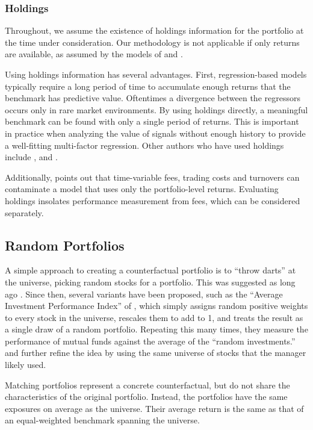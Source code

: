 \documentclass{article}\usepackage{graphicx, color}
\begin{document}
\subsubsection{Holdings}

Throughout, we assume the existence of holdings information for the portfolio at
the time under consideration. Our methodology is not applicable if
only returns are available, as assumed by the models of \cite{fama92} and
\cite{jensen68}.

Using holdings information has several advantages. First,
regression-based models typically require a
long period of time to accumulate enough returns that the benchmark
has predictive value. Oftentimes a divergence between the regressors
occurs only in rare market environments. By using holdings directly,
a meaningful benchmark can be found with only a single period of
returns. This is important in practice when analyzing the value of
signals without enough history to provide a well-fitting multi-factor
regression. Other authors who have used holdings include \cite{grinblatt89},
\cite{grinblatt93} and \cite{kosowski06}.

Additionally, \cite{daniel97.1} points out that time-variable fees, trading
costs and turnovers can contaminate a model that uses only the
portfolio-level returns. Evaluating holdings insolates performance
measurement from fees, which can be considered separately.

\subsection{Random Portfolios \label{SectionRandom}}

A simple approach to creating a counterfactual portfolio is to ``throw
darts'' at the universe, picking random stocks for a
portfolio. This was suggested as long ago \cite{lorie65}. Since then,
several variants have been proposed, such as the ``Average Investment
Performance Index'' of \cite{cohen66}, which simply assigns random
positive weights to every stock in the universe, rescales
them to add to 1, and treats the result as a single draw of a random
portfolio. Repeating this many times, they measure the performance
of mutual funds against the average of the ``random investments.''
\cite{burns04} and \cite{dawson03} further refine the idea by using
the same universe of stocks that the manager likely used.

Matching portfolios represent a concrete counterfactual, but do not
share the characteristics of the original portfolio. Instead, the portfolios
have the same exposures on average as the universe. Their average
return is the same as that of an equal-weighted benchmark spanning the
universe.
\end{document}
